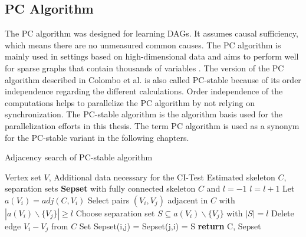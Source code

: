 \subsection{PC Algorithm}
The PC algorithm was designed for learning DAGs. It assumes causal sufficiency, which means there are no unmeasured common causes. The PC algorithm is mainly used in settings based on high-dimensional data and aims to perform well for sparse graphs that contain thousands of variables \cite{kalischUnderstandingHumanFunctioning2010}.
The version of the PC algorithm described in Colombo et al. \cite{colomboOrderIndependentConstraintBasedCausal2014} is also called PC-stable because of its order independence regarding the different calculations. Order independence of the computations helps to parallelize the PC algorithm by not relying on synchronization. The PC-stable algorithm is the algorithm basis used for the parallelization efforts in this thesis. The term PC algorithm is used as a synonym for the PC-stable variant in the following chapters.

\begin{algorithm}
    \caption{Adjacency search of PC-stable algorithm \cite{colomboOrderIndependentConstraintBasedCausal2014}}
    \label{alg:pcstable}
    \begin{algorithmic}[1]
    \Require Vertex set $V$, Additional data necessary for the CI-Test
    \Ensure Estimated skeleton $C$, separation sets \textbf{Sepset}
    \State with fully connected skeleton $C$ and $l = -1$
    \Repeat 
        \State $l=l+1$
            \State Let $a(V_i) = adj(C,V_i)$ \label{alg:pcstable_adjlist}
        \EndFor
        \Repeat \label{alg:pcstable_edgeloop}
            \State Select pairs $(V_i,V_j)$ adjacent in $C$ with $|a(V_i)\backslash\{V_j\}| \geq l$
            \Repeat
                \State Choose separation set $S \subseteq a(V_i ) \backslash \{V_j \}$ with $| S | = l$ \label{alg:pcstable_sepsbuild}
                 \label{alg:pcstable_alpha}
                    \State Delete edge $V_i - V_j$ from $C$
                    \State Set Sepset(i,j) = Sepset(j,i) = S
                \EndIf
    \State \textbf{return} C, Sepset
    \end{algorithmic}
\end{algorithm}

